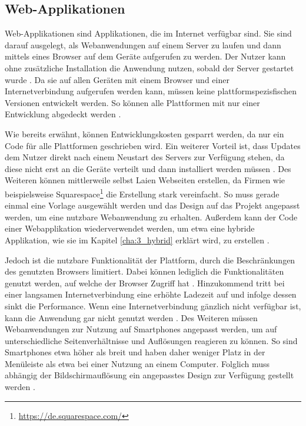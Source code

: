 \subsection{Web-Applikationen}
\label{cha:3_2_web}
Web-Applikationen sind Applikationen, die im Internet verfügbar sind. Sie sind darauf ausgelegt, als Webanwendungen auf einem Server zu laufen und dann mittels eines Browser auf dem Geräte aufgerufen zu werden. Der Nutzer kann ohne zusätzliche Installation die Anwendung nutzen, sobald der Server gestartet wurde \cite{IEEE_Khackouch_Al}.
Da sie auf allen Geräten mit einem Browser und einer Internetverbindung aufgerufen werden kann, müssen keine plattformspezisfischen Versionen entwickelt werden.
So können alle Plattformen mit nur einer Entwicklung abgedeckt werden \cite{IEEE_development_classes}.

Wie bereits erwähnt, können Entwicklungskosten gesparrt werden, da nur ein Code für alle Plattformen geschrieben wird. Ein weiterer Vorteil ist, dass Updates dem Nutzer direkt nach einem Neustart des Servers zur Verfügung stehen, da diese nicht erst an die Geräte verteilt und dann installiert werden müssen \cite{IEEE_Khackouch_Al}. Des Weiteren können mittlerweile selbst Laien Webseiten erstellen, da Firmen wie beispielsweise Squarespace\footnote{\url{https://de.squarespace.com/}} die Erstellung stark vereinfacht. So muss gerade einmal eine Vorlage ausgewählt werden und das Design auf das Projekt angepasst werden, um eine nutzbare Webanwendung zu erhalten. 
Außerdem kann der Code einer Webapplikation wiederverwendet werden, um etwa eine hybride Applikation, wie sie im Kapitel \ref{cha:3_hybrid} erklärt wird, zu erstellen \cite{IEEE_Khackouch_Al}. 

Jedoch ist die nutzbare Funktionalität der Plattform, durch die Beschränkungen des genutzten Browsers limitiert. Dabei können lediglich die Funktionalitäten genutzt werden, auf welche der Browser Zugriff hat \cite{Phyo}. Hinzukommend tritt bei einer langsamen Internetverbindung eine erhöhte Ladezeit auf und infolge dessen sinkt die Performance. Wenn eine Internetverbindung gänzlich nicht verfügbar ist, kann die Anwendung gar nicht genutzt werden \cite{IEEE_Khackouch_Al}. Des Weiteren müssen Webanwendungen zur Nutzung auf Smartphones angepasst werden, um auf unterschiedliche Seitenverhältnisse und Auflösungen reagieren zu können. So sind Smartphones etwa höher als breit und haben daher weniger Platz in der Menüleiste als etwa bei einer Nutzung an einem Computer. Folglich muss abhängig der Bildschirmauflösung ein angepasstes Design zur Verfügung gestellt werden \cite{Serrano_mobile}.

